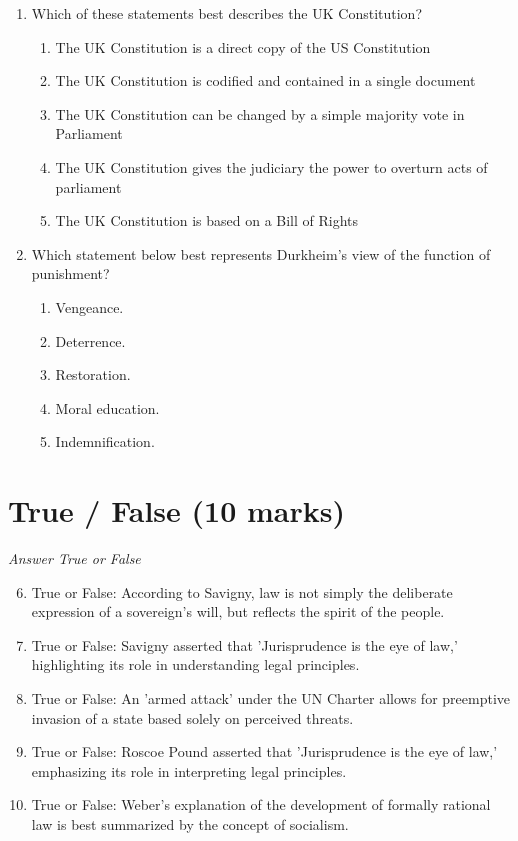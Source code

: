 \documentclass[12pt]{article}
\begin{document}
\begin{enumerate}[label=\arabic*.]
\begin{enumerate}[label=(\alph*)]
\end{enumerate}
\item Which of these statements best describes the UK Constitution?
\begin{enumerate}[label=(\alph*)]
    \item The UK Constitution is a direct copy of the US Constitution
    \item The UK Constitution is codified and contained in a single document
    \item The UK Constitution can be changed by a simple majority vote in Parliament
    \item The UK Constitution gives the judiciary the power to overturn acts of parliament
    \item The UK Constitution is based on a Bill of Rights
\end{enumerate}
\item Which statement below best represents Durkheim's view of the function of punishment?
\begin{enumerate}[label=(\alph*)]
    \item Vengeance.
    \item Deterrence.
    \item Restoration.
    \item Moral education.
    \item Indemnification.
\end{enumerate}
\end{enumerate}

\section*{True / False (10 marks)}
\textit{Answer True or False}
\begin{enumerate}[label=\arabic*.]
\setcounter{enumi}{5}
\item True or False: According to Savigny, law is not simply the deliberate expression of a sovereign's will, but reflects the spirit of the people.
\item True or False: Savigny asserted that 'Jurisprudence is the eye of law,' highlighting its role in understanding legal principles.
\item True or False: An 'armed attack' under the UN Charter allows for preemptive invasion of a state based solely on perceived threats.
\item True or False: Roscoe Pound asserted that 'Jurisprudence is the eye of law,' emphasizing its role in interpreting legal principles.
\item True or False: Weber's explanation of the development of formally rational law is best summarized by the concept of socialism.
\end{enumerate}
\end{document}
